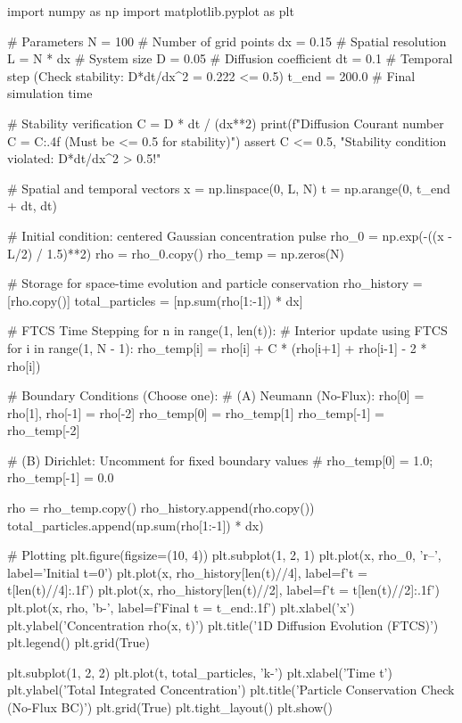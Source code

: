 \documentclass{article}
\begin{document}
\begin{jupytercode}
import numpy as np
import matplotlib.pyplot as plt

# Parameters
N = 100               # Number of grid points
dx = 0.15             # Spatial resolution
L = N * dx            # System size
D = 0.05              # Diffusion coefficient
dt = 0.1              # Temporal step (Check stability: D*dt/dx^2 = 0.222 <= 0.5)
t_end = 200.0         # Final simulation time

# Stability verification
C = D * dt / (dx**2)
print(f"Diffusion Courant number C = {C:.4f} (Must be <= 0.5 for stability)")
assert C <= 0.5, "Stability condition violated: D*dt/dx^2 > 0.5!"

# Spatial and temporal vectors
x = np.linspace(0, L, N)
t = np.arange(0, t_end + dt, dt)

# Initial condition: centered Gaussian concentration pulse
rho_0 = np.exp(-((x - L/2) / 1.5)**2)
rho = rho_0.copy()
rho_temp = np.zeros(N)

# Storage for space-time evolution and particle conservation
rho_history = [rho.copy()]
total_particles = [np.sum(rho[1:-1]) * dx]

# FTCS Time Stepping
for n in range(1, len(t)):
    # Interior update using FTCS
    for i in range(1, N - 1):
        rho_temp[i] = rho[i] + C * (rho[i+1] + rho[i-1] - 2 * rho[i])
        
    # Boundary Conditions (Choose one):
    # (A) Neumann (No-Flux): rho[0] = rho[1], rho[-1] = rho[-2]
    rho_temp[0] = rho_temp[1]
    rho_temp[-1] = rho_temp[-2]
    
    # (B) Dirichlet: Uncomment for fixed boundary values
    # rho_temp[0] = 1.0; rho_temp[-1] = 0.0

    rho = rho_temp.copy()
    rho_history.append(rho.copy())
    total_particles.append(np.sum(rho[1:-1]) * dx)

# Plotting
plt.figure(figsize=(10, 4))
plt.subplot(1, 2, 1)
plt.plot(x, rho_0, 'r--', label='Initial t=0')
plt.plot(x, rho_history[len(t)//4], label=f't = {t[len(t)//4]:.1f}')
plt.plot(x, rho_history[len(t)//2], label=f't = {t[len(t)//2]:.1f}')
plt.plot(x, rho, 'b-', label=f'Final t = {t_end:.1f}')
plt.xlabel('x')
plt.ylabel('Concentration rho(x, t)')
plt.title('1D Diffusion Evolution (FTCS)')
plt.legend()
plt.grid(True)

plt.subplot(1, 2, 2)
plt.plot(t, total_particles, 'k-')
plt.xlabel('Time t')
plt.ylabel('Total Integrated Concentration')
plt.title('Particle Conservation Check (No-Flux BC)')
plt.grid(True)
plt.tight_layout()
plt.show()
\end{jupytercode}
\newpage
\end{document}
